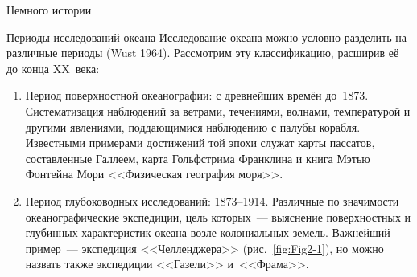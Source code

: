 \begin{chapter}{Немного истории}
\begin{section}{Периоды исследований океана}
Исследование океана можно условно разделить на различные периоды 
(Wust 1964). Рассмотрим эту классификацию, расширив её до конца XX~века:
%
\begin{enumerate}
\item  
Период поверхностной океанографии: с древнейших времён до~1873. 
Систематизация наблюдений за ветрами,
течениями, волнами, температурой и другими явлениями, поддающимися
наблюдению с палубы корабля. Известными примерами достижений той эпохи 
служат карты пассатов, составленные Галлеем, карта Гольфстрима Франклина 
и книга Мэтью Фонтейна Мори <<Физическая география моря>>.
%

\item
Период глубоководных исследований: 1873--1914.
Различные по значимости океанографические экспедиции, цель 
которых~--- выяснение поверхностных и глубинных характеристик океана возле
колониальных земель. Важнейший пример~--- экспедиция
<<Челленджера>> (рис.~\ref{fig:Fig2-1}), но можно назвать также экспедиции 
<<Газели>> и~<<Фрама>>.
%


\end{enumerate}
\end{section}
\end{chapter}
